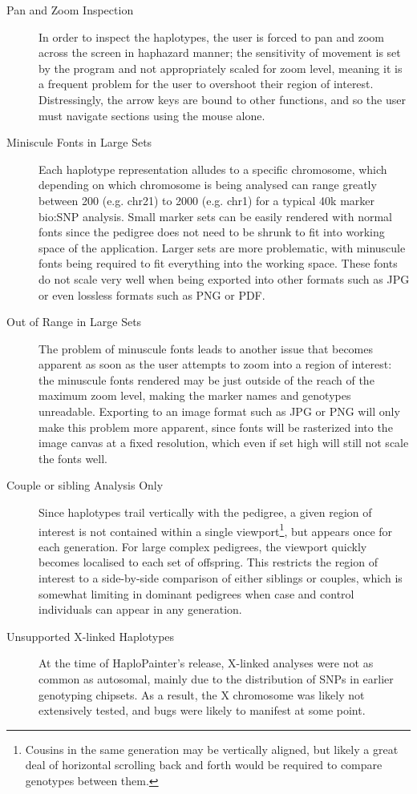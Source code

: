 \enlargethispage{-\baselineskip}
\begin{description}
\item[Pan and Zoom Inspection]{In order to inspect the haplotypes, the user is forced to pan and zoom across the screen in haphazard manner; the sensitivity of movement is set by the program and not appropriately scaled for zoom level, meaning it is a frequent problem for the user to overshoot their region of interest. Distressingly, the arrow keys are bound to other functions, and so the user must navigate sections using the mouse alone.}
\item[Miniscule Fonts in Large Sets]{Each haplotype representation alludes to a specific chromosome, which depending on which chromosome is being analysed can range greatly between 200 (e.g. chr21) to 2000 (e.g. chr1) for a typical 40k marker \gls{bio:SNP} analysis. Small marker sets can be easily rendered with normal fonts since the pedigree does not need to be shrunk to fit into working space of the application. Larger sets are more problematic, with minuscule fonts being required to fit everything into the working space. These fonts do not scale very well when being exported into other formats such as JPG or even lossless formats such as PNG or PDF.}
\item[Out of Range in Large Sets]{The problem of minuscule fonts leads to another issue that becomes apparent as soon as the user attempts to zoom into a region of interest: the minuscule fonts rendered may be just outside of the reach of the maximum zoom level, making the marker names and genotypes unreadable. Exporting to an image format such as JPG or PNG will only make this problem more apparent, since fonts will be rasterized into the image canvas at a fixed resolution, which even if set high will still not scale the fonts well.}
\item[Couple or sibling Analysis Only]{Since haplotypes trail vertically with the pedigree, a given region of interest is not contained within a single viewport\footnote{Cousins in the same generation may be vertically aligned, but likely a great deal of horizontal scrolling back and forth would be required to compare genotypes between them.}, but appears once for each generation. For large complex pedigrees, the viewport quickly becomes localised to each set of offspring. This restricts the region of interest to a side-by-side comparison of either siblings or couples, which is somewhat limiting in dominant pedigrees when case and control individuals can appear in any generation.}
\item[Unsupported X-linked Haplotypes]{At the time of HaploPainter's release, X-linked analyses were not as common as autosomal, mainly due to the distribution of SNPs in earlier genotyping chipsets. As a result, the X chromosome was likely not extensively tested, and bugs were likely to manifest at some point.}
\end{description}

